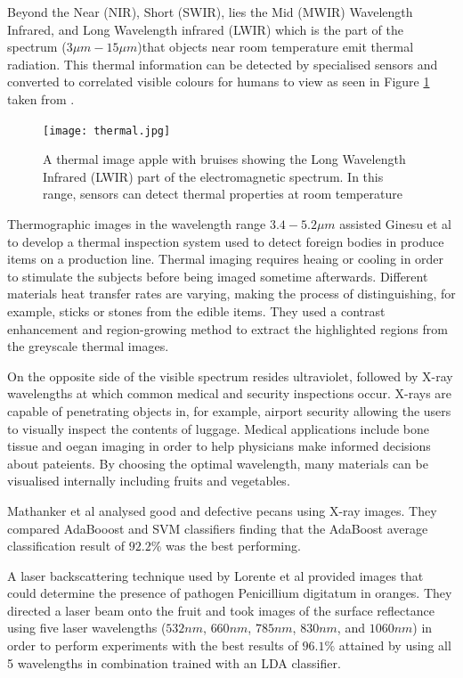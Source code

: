 \documentclass[fleqn,twoside]{article}
\begin{document}
Beyond the Near (NIR), Short (SWIR), lies the Mid (MWIR) Wavelength Infrared, and  Long Wavelength infrared (LWIR) which is the part of the spectrum ($3\mu m-15\mu m$)that objects near room temperature emit thermal radiation. This thermal information can be detected by specialised sensors and converted to correlated visible colours for humans to view as seen in Figure \ref{fig:thermal} taken from \cite{baranowski}.

\begin{figure}[h]
	\centering
	\texttt{[image: thermal.jpg]}
	\caption{A thermal image apple with bruises showing the Long Wavelength Infrared (LWIR) part of the electromagnetic spectrum. In this range, sensors can detect thermal properties at room temperature}
	\label{fig:thermal}
\end{figure}%


Thermographic images in the wavelength range $3.4-5.2\mu m$ assisted Ginesu et al \cite{ginesu} to develop a thermal inspection system used to detect foreign bodies in produce items on a production line. Thermal imaging requires heaing or cooling in order to stimulate the subjects before being imaged sometime afterwards. Different materials heat transfer rates are varying, making the process of distinguishing, for example, sticks or stones from the edible items. They used a contrast enhancement and region-growing method to extract the highlighted regions from the greyscale thermal images.

On the opposite side of the visible spectrum resides ultraviolet, followed by X-ray wavelengths at which common medical and security inspections occur. X-rays are capable of penetrating objects in, for example, airport security allowing the users to visually inspect the contents of luggage. Medical applications include bone tissue and oegan imaging in order to help physicians make informed decisions about pateients. By choosing the optimal wavelength, many materials can be visualised internally including fruits and vegetables.    

Mathanker et al \cite{mathanker} analysed good and defective pecans using X-ray images. They compared AdaBooost and SVM classifiers finding that the AdaBoost average classification result of $92.2\%$ was the best performing.

A laser backscattering technique used by Lorente et al \cite{lorente} provided images that could determine the presence of pathogen Penicillium digitatum in oranges. They directed a laser beam onto the fruit and took images of the surface reflectance using five laser wavelengths ($532nm$, $660nm$, $785nm$, $830nm$, and $1060nm$) in order to perform experiments with the best results of $96.1\%$ attained by using all 5 wavelengths in combination trained with an LDA classifier.
\end{document}
